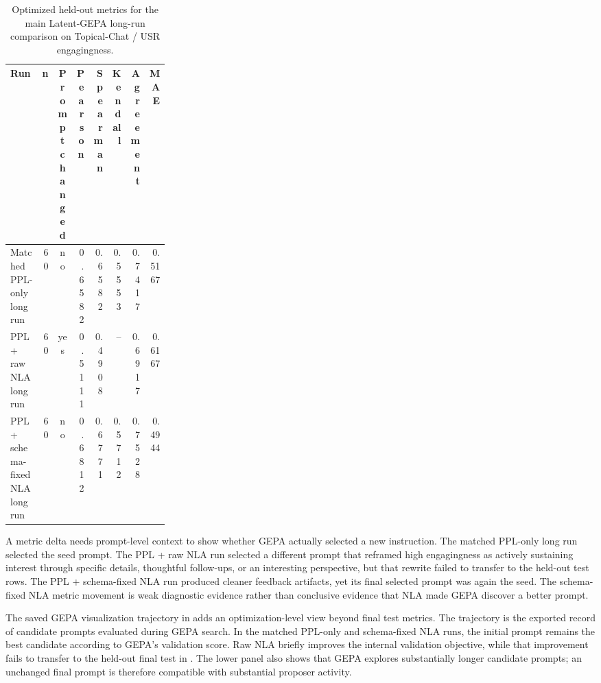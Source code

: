 \documentclass[12pt,a4paper,twoside,openright]{book}
\begin{document}
\begin{table}[!htb]
    \centering
    \scriptsize
    \begin{adjustbox}{width=\textwidth}
    \begin{tabular}{p{0.27\linewidth} r c r r r r r}
        \toprule
        \textbf{Run} & \textbf{n} & \textbf{Prompt changed} & \textbf{Pearson} & \textbf{Spearman} & \textbf{Kendall} & \textbf{Agreement} & \textbf{MAE} \\
        \midrule
        Matched PPL-only long run &
        60 & no & 0.6582 & 0.6582 & 0.5553 & 0.7417 & 0.5167 \\
        PPL + raw NLA long run &
        60 & yes & 0.5111 & 0.4908 & -- & 0.6917 & 0.6167 \\
        PPL + schema-fixed NLA long run &
        60 & no & 0.6812 & 0.6771 & 0.5712 & 0.7528 & 0.4944 \\
        \bottomrule
    \end{tabular}
    \end{adjustbox}
    \caption{Optimized held-out metrics for the main Latent-GEPA long-run
    comparison on Topical-Chat / USR engagingness.}
    \label{tab:gepa-long-nla-comparison}
\end{table}

A metric delta needs prompt-level context to show whether GEPA actually selected
a new instruction. The matched PPL-only long run selected the seed prompt. The
PPL + raw NLA run selected a different prompt that reframed high engagingness as
actively sustaining interest through specific details, thoughtful follow-ups, or
an interesting perspective, but that rewrite failed to transfer to the held-out
test rows. The PPL + schema-fixed NLA run produced cleaner feedback artifacts,
yet its final selected prompt was again the seed. The schema-fixed NLA metric
movement is weak diagnostic evidence rather than conclusive evidence that NLA
made GEPA discover a better prompt.

The saved GEPA visualization trajectory in
 adds an optimization-level view
beyond final test metrics. The trajectory is the exported record of candidate
prompts evaluated during GEPA search. In the matched PPL-only and schema-fixed
NLA runs, the initial prompt remains the best candidate according to GEPA's
validation score. Raw NLA briefly improves the internal validation objective,
while that improvement fails to transfer to the held-out final test in
. The lower panel also shows that GEPA
explores substantially longer candidate prompts; an unchanged final prompt is
therefore compatible with substantial proposer activity.
\end{document}

